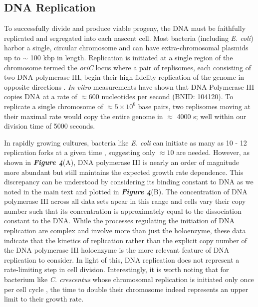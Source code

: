 \subsection{DNA Replication}
To successfully divide and produce viable progeny, the DNA must be
faithfully replicated and segregated into each nascent cell. Most bacteria
(including \textit{E. coli}) harbor a single, circular chromosome and can have
extra-chromosomal plasmids up to $\sim$ 100 kbp in length. Replication is initiated at a single region of the
chromosome termed the \textit{oriC} locus where a pair of replisomes, each
consisting of two DNA polymerase III, begin their high-fidelity replication of
the genome in opposite directions \citep{fijalkowska2012}. \textit{In vitro}
measurements have shown that DNA Polymerase III copies DNA at a rate of $\approx
600$ nucleotides per second (BNID: 104120). To replicate a single chromosome of
$\approx 5\times 10^6$ base pairs, two replisomes moving at their maximal rate
would copy the entire genome in $\approx$ 4000 s; well within our division time
of 5000 seconds.

In rapidly growing cultures, bacteria like \textit{E. coli} can initiate as many
as 10 - 12 replication forks at a given time \citep{bremer2008, si2017},
suggesting  only $\approx 10$ are needed. However, as shown in
\textbf{\textit{Figure 4}}(A), DNA polymerase III is nearly an order of magnitude more
abundant but still maintains the expected growth rate dependence. This
discrepancy can be understood by considering its binding constant to DNA as we noted in
the main text and plotted in  \textbf{\textit{Figure 4}}(B).
The concentration of DNA polymerase III across
all data sets apear in this range and cells vary their copy number such that its
concentration is approximately equal to the dissociation constant to the DNA.
While the processes regulating the initiation of DNA replication are complex and
involve more than just the holoenzyme, these data indicate that the kinetics of
replication rather than the explicit copy number of the DNA polymerase III
holoenzyme is the more relevant feature of DNA replication to consider. In light
of this, DNA replication does not represent a rate-limiting step in
cell division. Interestingly, it is worth noting that for bacterium like \textit{C.
crescentus} whose chromosomal replication is initiated only once per cell cycle
\citep{jensen2001}, the time to double their chromosome indeed represents an
upper limit to their growth rate.

